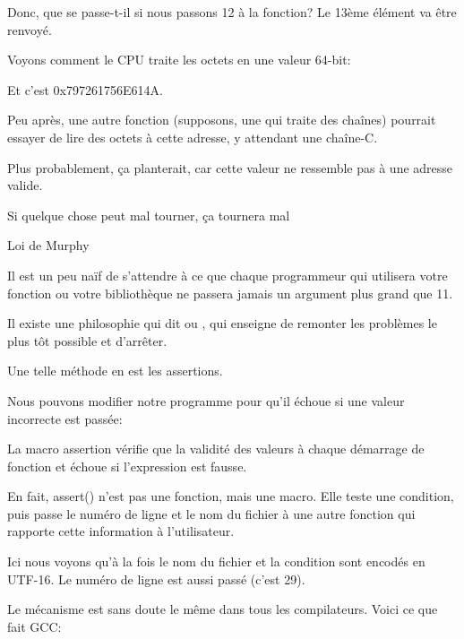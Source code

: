 Donc, que se passe-t-il si nous passons 12 à la fonction?
Le 13ème élément va être renvoyé.

Voyons comment le CPU traite les octets en une valeur 64-bit:



Et c'est 0x797261756E614A.

Peu après, une autre fonction (supposons, une qui traite des chaînes) pourrait essayer
de lire des octets à cette adresse, y attendant une chaîne-C.

Plus probablement, ça planterait, car cette valeur ne ressemble pas à une adresse
valide.


\epigraph{Si quelque chose peut mal tourner, ça tournera mal}{Loi de Murphy}

Il est un peu naïf de s'attendre à ce que chaque programmeur qui utilisera votre
fonction ou votre bibliothèque ne passera jamais un argument plus grand que 11.

Il existe une philosophie qui dit  ou ,
qui enseigne de remonter les problèmes le plus tôt possible et d'arrêter.

Une telle méthode en \CCpp est les assertions.

Nous pouvons modifier notre programme pour qu'il échoue si une valeur incorrecte
est passée:



La macro assertion vérifie que la validité des valeurs à chaque démarrage de fonction
et échoue si l'expression est fausse.



En fait, assert() n'est pas une fonction, mais une macro. Elle teste une condition,
puis passe le numéro de ligne et le nom du fichier à une autre fonction qui rapporte
cette information à l'utilisateur.

Ici nous voyons qu'à la fois le nom du fichier et la condition sont encodés en UTF-16.
Le numéro de ligne est aussi passé (c'est 29).

Le mécanisme est sans doute le même dans tous les compilateurs.
Voici ce que fait GCC:


